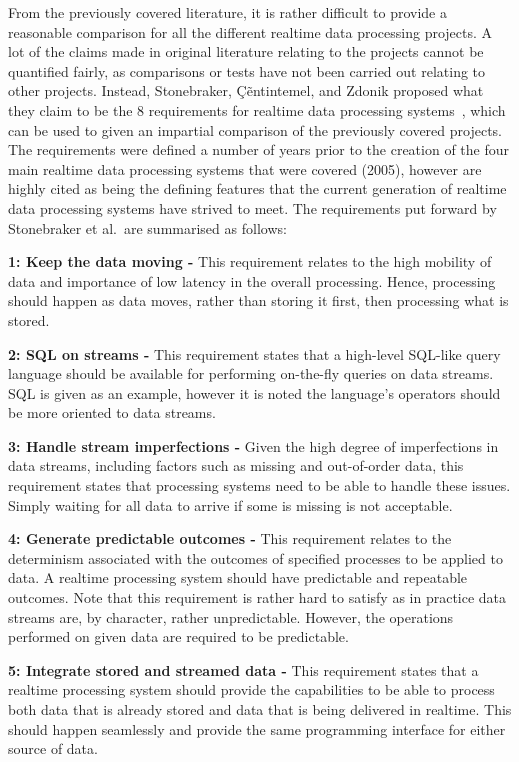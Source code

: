 \documentclass[a4paper,11pt]{article}
\begin{document}
From the previously covered literature, it is rather difficult to provide a reasonable comparison for all the different
realtime data processing projects. A lot of the claims made in original literature relating to the projects cannot be
quantified fairly, as comparisons or tests have not been carried out relating to other projects. Instead, Stonebraker,
\c{C}\~entintemel, and Zdonik proposed what they claim to be the 8 requirements for realtime data processing systems~\cite{stonebraker_8_2005},
which can be used to given an impartial comparison of the previously covered projects. The requirements were defined a
number of years prior to the creation of the four main realtime data processing systems that were covered (2005), however are highly
cited as being the defining features that the current generation of realtime data processing systems have strived to meet.
The requirements put forward by Stonebraker et al.\ are summarised as follows:

\noindent \textbf{1: Keep the data moving -} This requirement relates to the high mobility of data and importance of low
latency in the overall processing. Hence, processing should happen as data moves, rather than storing it first, then
processing what is stored.

\noindent \textbf{2: SQL on streams -} This requirement states that a high-level SQL-like query language should be
available for performing on-the-fly queries on data streams. SQL is given as an example, however it is noted the language's
operators should be more oriented to data streams.

\noindent \textbf{3: Handle stream imperfections -} Given the high degree of imperfections in data streams, including
factors such as missing and out-of-order data, this requirement states that processing systems need to be able to handle
these issues. Simply waiting for all data to arrive if some is missing is not acceptable.

\noindent \textbf{4: Generate predictable outcomes -} This requirement relates to the determinism associated with the
outcomes of specified processes to be applied to data. A realtime processing system should have predictable and repeatable
outcomes. Note that this requirement is rather hard to satisfy as in practice data streams are, by character, rather
unpredictable. However, the operations performed on given data are required to be predictable.

\noindent \textbf{5: Integrate stored and streamed data -} This requirement states that a realtime processing system
should provide the capabilities to be able to process both data that is already stored and data that is being delivered
in realtime. This should happen seamlessly and provide the same programming interface for either source of data.
\end{document}
